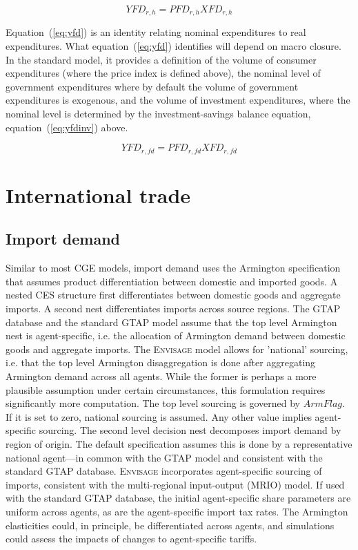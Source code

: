 \documentclass[11pt,letterpaper]{report}
\begin{document}
\begin{equation}
\label{eq:pce}
\mathit{YFD_{r,h}} = \mathit{PFD}_{r,h} \mathit{XFD}_{r,h}
\end{equation}

Equation~(\ref{eq:yfd}) is an identity relating nominal expenditures to real
expenditures. What equation~(\ref{eq:yfd}) identifies will depend on macro
closure. In the standard model, it provides a definition of the volume of
consumer expenditures (where the price index is defined above), the nominal
level of government expenditures where by default the volume of government
expenditures is exogenous, and the volume of investment expenditures, where the
nominal level is determined by the investment-savings balance equation,
equation~(\ref{eq:yfdinv}) above.

\begin{equation}
\label{eq:yfd}
\mathit{YFD}_{r,fd} = \mathit{PFD}_{r,fd} \mathit{XFD}_{r,fd}
\end{equation}

\section{International trade}
\renewcommand{\theequation}{{T-}\arabic{equation}}
\setcounter{equation}{0}

\subsection{Import demand}

Similar to most CGE models, import demand uses the Armington specification that
assumes product differentiation between domestic and imported goods. A nested
CES structure first differentiates between domestic goods and aggregate imports.
A second nest differentiates imports across source regions. The GTAP database
and the standard GTAP model assume that the top level Armington nest is
agent-specific, i.e. the allocation of Armington demand between domestic goods
and aggregate imports. The \textsc{Envisage} model allows for 'national'
sourcing, i.e. that the top level Armington disaggregation is done after
aggregating Armington demand across all agents. While the former is perhaps a
more plausible assumption under certain circumstances, this formulation requires
significantly more computation. The top level sourcing is governed by
$\mathit{ArmFlag}$. If it is set to zero, national sourcing is assumed. Any
other value implies agent-specific sourcing. The second level decision nest
decomposes import demand by region of origin. The default specification assumes
this is done by a representative national agent---in common with the GTAP model
and consistent with the standard GTAP database. \textsc{Envisage} incorporates
agent-specific sourcing of imports, consistent with the multi-regional
input-output (MRIO) model. If used with the standard GTAP database, the initial
agent-specific share parameters are uniform across agents, as are the
agent-specific import tax rates. The Armington elasticities could, in principle,
be differentiated across agents, and simulations could assess the impacts of
changes to agent-specific tariffs.
\end{document}
